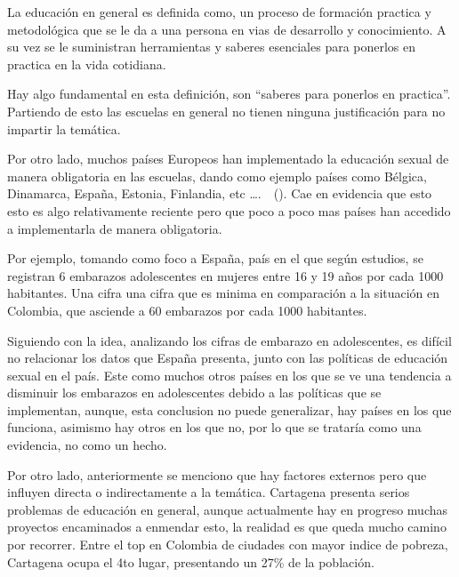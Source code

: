 \documentclass[letterpaper, 12pt]{article}
\begin{document}

La educación en general es definida como, un proceso de
formación practica y metodológica que se le da a una
persona en vias de desarrollo y conocimiento. A su vez se
le suministran herramientas y saberes esenciales para
ponerlos en practica en la vida
cotidiana.~\nocite{sánchez_2022}

Hay algo fundamental en esta definición, son ``saberes para
ponerlos en practica''. Partiendo de esto las escuelas en
general no tienen ninguna justificación para no impartir la
temática.

Por otro lado, muchos países Europeos han implementado la
educación sexual de manera obligatoria en las escuelas,
dando como ejemplo países como Bélgica, Dinamarca, España,
Estonia, Finlandia, etc
\dots.~\nocite{FundacionSexpol}~(\cite{PhotoPaísesEuropa}).
Cae en evidencia que esto esto es algo relativamente
reciente pero que poco a poco mas países han accedido a
implementarla de manera obligatoria.

\nocite{bancoMundial}

Por ejemplo, tomando como foco a España, país en el que
según estudios, se registran 6 embarazos adolescentes en
mujeres entre 16 y 19 años por cada 1000 habitantes. Una
cifra una cifra que es minima en comparación a la situación
en Colombia, que asciende a 60 embarazos por cada 1000
habitantes.

Siguiendo con la idea, analizando los cifras de embarazo en
adolescentes, es difícil no relacionar los datos que España
presenta, junto con las políticas de educación sexual en el
país. Este como muchos otros países en los que se ve una
tendencia a disminuir los embarazos en adolescentes debido
a las políticas que se implementan, aunque, esta conclusion
no puede generalizar, hay países en los que funciona,
asimismo hay otros en los que no, por lo que se trataría
como una evidencia, no como un hecho.


\nocite{MinEducacion}
\nocite{CartagenaComoVamos__1}
\nocite{CifrasCartagena}

Por otro lado, anteriormente se menciono que hay factores
externos pero que influyen directa o indirectamente a la
temática. Cartagena presenta serios problemas de educación
en general, aunque actualmente hay en progreso muchas
proyectos encaminados a enmendar esto, la realidad es que
queda mucho camino por recorrer. Entre el top en Colombia
de ciudades con mayor indice de pobreza, Cartagena ocupa el
4to lugar, presentando un 27\% de la población.
\end{document}
